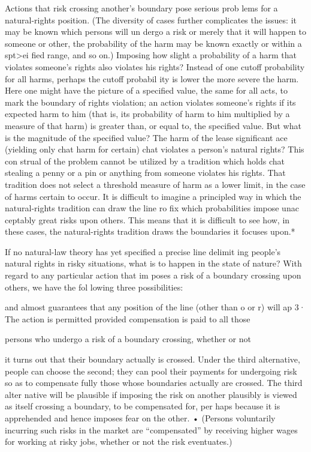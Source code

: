 \documentclass[11pt,openany]{book}
\begin{document}
Actions that risk crossing another's boundary pose serious prob lems for a natural-rights position. (The diversity of cases further complicates the issues: it may be known which persons will un dergo a risk or merely that it will happen to someone or other, the probability of the harm may be known exactly or within a spt>ei fied range, and so on.) Imposing how slight a probability of a harm that violates someone's rights also violates his rights? Instead of one cutoff probability for all harms, perhaps the cutoff probabil ity is lower the more severe the harm. Here one might have the picture of a specified value, the same for all acts, to mark the boundary of rights violation; an action violates someone's rights if its expected harm to him (that is, its probability of harm to him multiplied by a measure of that harm) is greater than, or equal to, the specified value. But what is the magnitude of the specified value? The harm of the lease significant ace (yielding only chat harm for certain) chat violates a person's natural rights? This con strual of the problem cannot be utilized by a tradition which holds chat stealing a penny or a pin or anything from someone violates his rights. That tradition does not select a threshold measure of harm as a lower limit, in the case of harms certain to occur. It is difficult to imagine a principled way in which the natural-rights tradition can draw the line ro fix which probabilities impose unac ceptably great risks upon others. This means that it is difficult to see how, in these cases, the natural-rights tradition draws the boundaries it focuses upon.* 

If no natural-law theory has yet specified a precise line delimit ing people's natural rights in risky situations, what is to happen in the state of nature? With regard to any particular action that im poses a risk of a boundary crossing upon others, we have the fol lowing three possibilities: 

and almost guarantees that any position of the line (other than o or r) will ap 3· The action is permitted provided compensation is paid to all those 

persons who undergo a risk of a boundary crossing, whether or not 

it turns out that their boundary actually is crossed. Under the third alternative, people can choose the second; they can pool their payments for undergoing risk so as to compensate fully those whose boundaries actually are crossed. The third alter native will be plausible if imposing the risk on another plausibly is viewed as itself crossing a boundary, to be compensated for, per haps because it is apprehended and hence imposes fear on the other. • (Persons voluntarily incurring such risks in the market are ``compensated'' by receiving higher wages for working at risky jobs, whether or not the risk eventuates.) 
\end{document}
